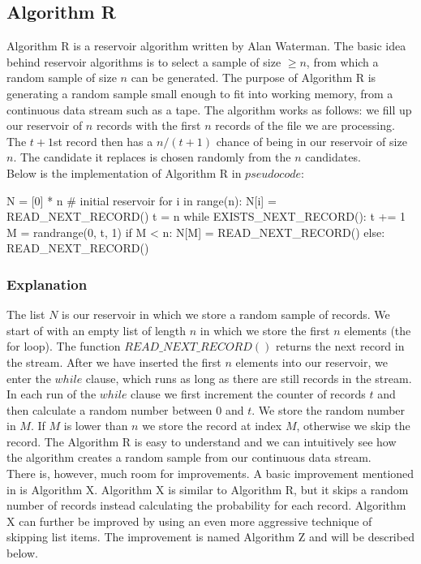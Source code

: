 \documentclass[journal]{IEEEtran/IEEEtran}
\begin{document}
\subsection{Algorithm R}
Algorithm R is a reservoir algorithm written by Alan Waterman\cite{reservoir85}. The basic idea behind reservoir algorithms is to select a sample of size $\ge n$, from which a random sample of size $n$ can be generated. The purpose of Algorithm R is generating a random sample small enough to fit into working memory, from a continuous data stream such as a tape. The algorithm works as follows: we fill up our reservoir of $n$ records with the first $n$ records of the file we are processing. The $t + 1$st record then has a $n/(t + 1)$ chance of being in our reservoir of size $n$. The candidate it replaces is chosen randomly from the $n$ candidates.
\\

Below is the implementation of Algorithm R in $pseudo code$:\\
\begin{code}
N = [0] * n # initial reservoir
for i in range(n):
  N[i] = READ_NEXT_RECORD()
t = n
while EXISTS_NEXT_RECORD():
  t += 1
  M = randrange(0, t, 1)
  if M < n:
    N[M] = READ_NEXT_RECORD()
  else:
    READ_NEXT_RECORD()	

\end{code}
\subsubsection*{Explanation}
The list $N$ is our reservoir in which we store a random sample of records. We start of with an empty list of length $n$ in which we store the first $n$ elements (the for loop). The function $READ\_NEXT\_RECORD()$ returns the next record in the stream. After we have inserted the first $n$ elements into our reservoir, we enter the $while$ clause, which runs as long as there are still records in the stream. In each run of the $while$ clause we first increment the counter of records $t$ and then calculate a random number between $0$ and $t$. We store the random number in $M$. If $M$ is lower than $n$ we store the record at index $M$, otherwise we skip the record. The Algorithm R is easy to understand and we can intuitively see how the algorithm creates a random sample from our continuous data stream.\\

There is, however, much room for improvements. A basic improvement mentioned in \cite{reservoir85} is Algorithm X. Algorithm X is similar to Algorithm R, but it skips a random number of records instead calculating the probability for each record. Algorithm X can further be improved by using an even more aggressive technique of skipping list items. The improvement is named Algorithm Z and will be described below.
\end{document}
